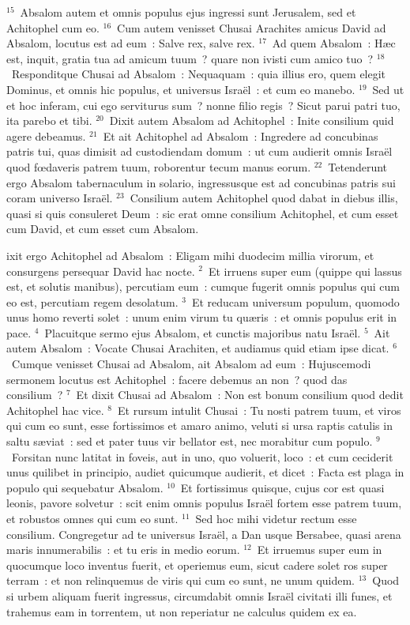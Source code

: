 ${}^{15}$~Absalom autem et omnis populus ejus ingressi sunt Jerusalem, sed et Achitophel cum eo.
${}^{16}$~Cum autem venisset Chusai Arachites amicus David ad Absalom, locutus est ad eum~: Salve rex, salve rex.
${}^{17}$~Ad quem Absalom~: H\ae c est, inquit, gratia tua ad amicum tuum~? quare non ivisti cum amico tuo~?
${}^{18}$~Responditque Chusai ad Absalom~: Nequaquam~: quia illius ero, quem elegit Dominus, et omnis hic populus, et universus Isra\"el~: et cum eo manebo.
${}^{19}$~Sed ut et hoc inferam, cui ego serviturus sum~? nonne filio regis~? Sicut parui patri tuo, ita parebo et tibi.
${}^{20}$~Dixit autem Absalom ad Achitophel~: Inite consilium quid agere debeamus.
${}^{21}$~Et ait Achitophel ad Absalom~: Ingredere ad concubinas patris tui, quas dimisit ad custodiendam domum~: ut cum audierit omnis Isra\"el quod fœdaveris patrem tuum, roborentur tecum manus eorum.
${}^{22}$~Tetenderunt ergo Absalom tabernaculum in solario, ingressusque est ad concubinas patris sui coram universo Isra\"el.
${}^{23}$~Consilium autem Achitophel quod dabat in diebus illis, quasi si quis consuleret Deum~: sic erat omne consilium Achitophel, et cum esset cum David, et cum esset cum Absalom.

\bchapter
{}ixit ergo Achitophel ad Absalom~: Eligam mihi duodecim millia virorum, et consurgens persequar David hac nocte.
${}^{2}$~Et irruens super eum (quippe qui lassus est, et solutis manibus), percutiam eum~: cumque fugerit omnis populus qui cum eo est, percutiam regem desolatum.
${}^{3}$~Et reducam universum populum, quomodo unus homo reverti solet~: unum enim virum tu qu\ae ris~: et omnis populus erit in pace.
${}^{4}$~Placuitque sermo ejus Absalom, et cunctis majoribus natu Isra\"el.
${}^{5}$~Ait autem Absalom~: Vocate Chusai Arachiten, et audiamus quid etiam ipse dicat.
${}^{6}$~Cumque venisset Chusai ad Absalom, ait Absalom ad eum~: Hujuscemodi sermonem locutus est Achitophel~: facere debemus an non~? quod das consilium~?
${}^{7}$~Et dixit Chusai ad Absalom~: Non est bonum consilium quod dedit Achitophel hac vice.
${}^{8}$~Et rursum intulit Chusai~: Tu nosti patrem tuum, et viros qui cum eo sunt, esse fortissimos et amaro animo, veluti si ursa raptis catulis in saltu s\ae viat~: sed et pater tuus vir bellator est, nec morabitur cum populo.
${}^{9}$~Forsitan nunc latitat in foveis, aut in uno, quo voluerit, loco~: et cum ceciderit unus quilibet in principio, audiet quicumque audierit, et dicet~: Facta est plaga in populo qui sequebatur Absalom.
${}^{10}$~Et fortissimus quisque, cujus cor est quasi leonis, pavore solvetur~: scit enim omnis populus Isra\"el fortem esse patrem tuum, et robustos omnes qui cum eo sunt.
${}^{11}$~Sed hoc mihi videtur rectum esse consilium. Congregetur ad te universus Isra\"el, a Dan usque Bersabee, quasi arena maris innumerabilis~: et tu eris in medio eorum.
${}^{12}$~Et irruemus super eum in quocumque loco inventus fuerit, et operiemus eum, sicut cadere solet ros super terram~: et non relinquemus de viris qui cum eo sunt, ne unum quidem.
${}^{13}$~Quod si urbem aliquam fuerit ingressus, circumdabit omnis Isra\"el civitati illi funes, et trahemus eam in torrentem, ut non reperiatur ne calculus quidem ex ea.



